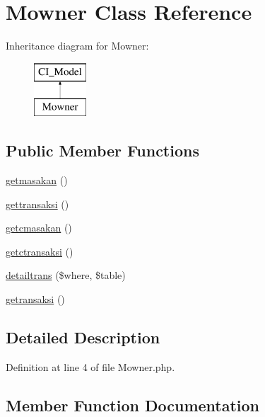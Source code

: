 \hypertarget{class_mowner}{}\section{Mowner Class Reference}
\label{class_mowner}
Inheritance diagram for Mowner\+:\begin{figure}[H]
\begin{center}
\leavevmode
\includegraphics[height=2.000000cm]{class_mowner}
\end{center}
\end{figure}
\subsection*{Public Member Functions}
\begin{DoxyCompactItemize}
\item 
\mbox{\hyperlink{class_mowner_af6cb3909c84d55dc39b68e22ad1c7ad3}{getmasakan}} ()
\item 
\mbox{\hyperlink{class_mowner_ab958d1edbfec72a356320e4cdc1f03ee}{gettransaksi}} ()
\item 
\mbox{\hyperlink{class_mowner_a9d032035c2608fe02d59175884d5bedf}{getcmasakan}} ()
\item 
\mbox{\hyperlink{class_mowner_a29406a8996c33e2ae572dcd11634af8c}{getctransaksi}} ()
\item 
\mbox{\hyperlink{class_mowner_aaafb5a78abca2bcfc620d32d57da6a7c}{detailtrans}} (\$where, \$table)
\item 
\mbox{\hyperlink{class_mowner_a3319423f546cd9da9d35934bc832f5d5}{getransaksi}} ()
\end{DoxyCompactItemize}


\subsection{Detailed Description}


Definition at line 4 of file Mowner.\+php.



\subsection{Member Function Documentation}
\mbox{\label{class_mowner_aaafb5a78abca2bcfc620d32d57da6a7c}} 
